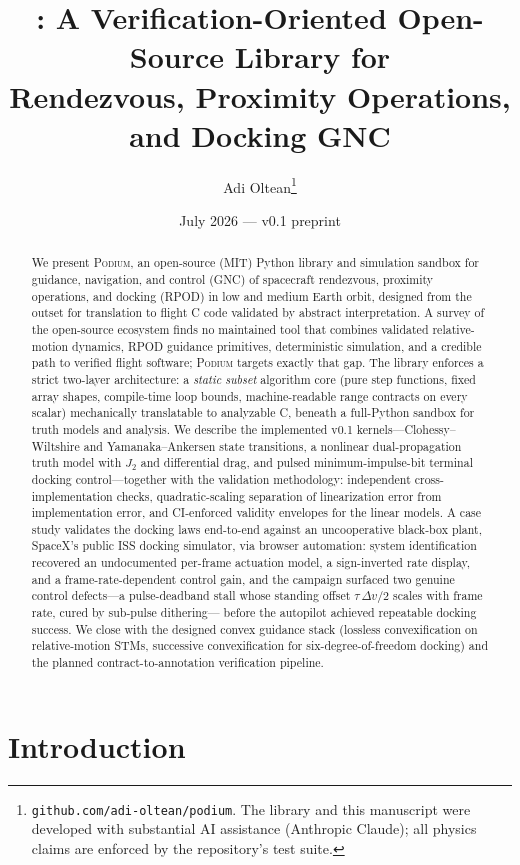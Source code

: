 \documentclass[11pt]{article}
\title{\podium: A Verification-Oriented Open-Source Library for\\
Rendezvous, Proximity Operations, and Docking GNC}
\author{Adi Oltean\thanks{\texttt{github.com/adi-oltean/podium}. The library and this
manuscript were developed with substantial AI assistance (Anthropic Claude);
all physics claims are enforced by the repository's test suite.}}
\date{July 2026 --- v0.1 preprint}
\newcommand{\podium}{\textsc{Podium}}
\begin{document}
\maketitle

\begin{abstract}
We present \podium{}, an open-source (MIT) Python library and simulation
sandbox for guidance, navigation, and control (GNC) of spacecraft rendezvous,
proximity operations, and docking (RPOD) in low and medium Earth orbit,
designed from the outset for translation to flight C code validated by
abstract interpretation. A survey of the open-source ecosystem finds no
maintained tool that combines validated relative-motion dynamics, RPOD
guidance primitives, deterministic simulation, and a credible path to
verified flight software; \podium{} targets exactly that gap. The library
enforces a strict two-layer architecture: a \emph{static subset} algorithm
core (pure step functions, fixed array shapes, compile-time loop bounds,
machine-readable range contracts on every scalar) mechanically translatable
to analyzable C, beneath a full-Python sandbox for truth models and analysis.
We describe the implemented v0.1 kernels---Clohessy--Wiltshire and
Yamanaka--Ankersen state transitions, a nonlinear dual-propagation truth
model with $J_2$ and differential drag, and pulsed minimum-impulse-bit
terminal docking control---together with the validation methodology:
independent cross-implementation checks, quadratic-scaling separation of
linearization error from implementation error, and CI-enforced validity
envelopes for the linear models. A case study validates the docking laws
end-to-end against an uncooperative black-box plant, SpaceX's public ISS
docking simulator, via browser automation: system identification recovered
an undocumented per-frame actuation model, a sign-inverted rate display, and
a frame-rate-dependent control gain, and the campaign surfaced two genuine
control defects---a pulse-deadband stall whose standing offset
$\tau\,\Delta v/2$ scales with frame rate, cured by sub-pulse dithering---
before the autopilot achieved repeatable docking success. We close with the
designed convex guidance stack (lossless convexification on relative-motion
STMs, successive convexification for six-degree-of-freedom docking) and the
planned contract-to-annotation verification pipeline.
\end{abstract}

\section{Introduction}
\end{document}
